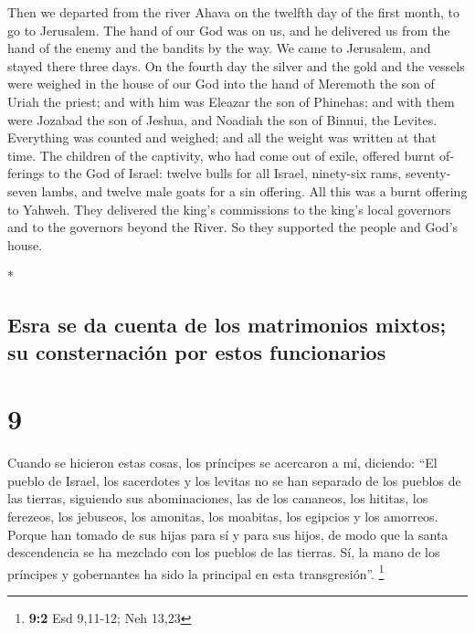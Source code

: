 \begin{paracol}{2}
\begin{otherlanguage}{english}
 Then we departed from the river Ahava on the twelfth day
of the first month, to go to Jerusalem. The hand of our God was on us,
and he delivered us from the hand of the enemy and the bandits by the
way.  We came to Jerusalem, and stayed there three days.
 On the fourth day the silver and the gold and the
vessels were weighed in the house of our God into the hand of Meremoth
the son of Uriah the priest; and with him was Eleazar the son of
Phinehas; and with them were Jozabad the son of Jeshua, and Noadiah the
son of Binnui, the Levites.  Everything was counted and
weighed; and all the weight was written at that time. 
The children of the captivity, who had come out of exile, offered burnt
offerings to the God of Israel: twelve bulls for all Israel, ninety-six
rams, seventy-seven lambs, and twelve male goats for a sin offering. All
this was a burnt offering to Yahweh.  They delivered the
king's commissions to the king's local governors and to the governors
beyond the River. So they supported the people and God's house.

\end{otherlanguage}

\switchcolumn[0]*

\hypertarget{esra-se-da-cuenta-de-los-matrimonios-mixtos-su-consternaciuxf3n-por-estos-funcionarios}{%
\subsection{Esra se da cuenta de los matrimonios mixtos; su
consternación por estos
funcionarios}\label{esra-se-da-cuenta-de-los-matrimonios-mixtos-su-consternaciuxf3n-por-estos-funcionarios}}

\hypertarget{section-16}{%
\section{9}\label{section-16}}

 Cuando se hicieron estas cosas, los príncipes se
acercaron a mí, diciendo: ``El pueblo de Israel, los sacerdotes y los
levitas no se han separado de los pueblos de las tierras, siguiendo sus
abominaciones, las de los cananeos, los hititas, los ferezeos, los
jebuseos, los amonitas, los moabitas, los egipcios y los amorreos.
 Porque han tomado de sus hijas para sí y para sus hijos,
de modo que la santa descendencia se ha mezclado con los pueblos de las
tierras. Sí, la mano de los príncipes y gobernantes ha sido la principal
en esta transgresión''. \footnote{\textbf{9:2} Esd 9,11-12; Neh 13,23}


\end{paracol}
